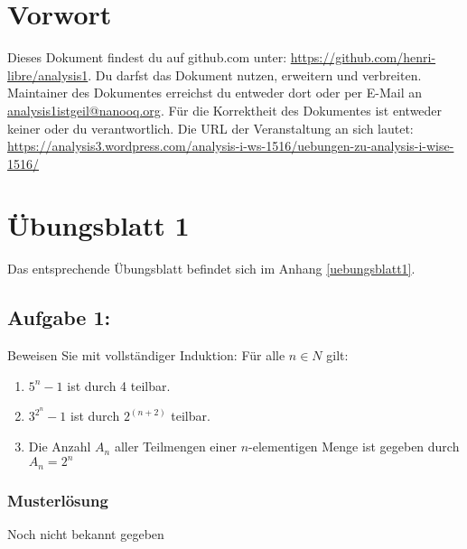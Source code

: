 \documentclass[12pt,a4paper]{report}
\begin{document}
	\tableofcontents
	\newpage
	
	\chapter{Vorwort}
	Dieses Dokument findest du auf github.com unter: \href{https://github.com/henri-libre/analysis1}{https://github.com/henri-libre/analysis1}. Du darfst das Dokument nutzen, erweitern und verbreiten. Maintainer des Dokumentes erreichst du entweder dort oder per E-Mail an \href{analysis1istgeil@nanooq.org}{analysis1istgeil@nanooq.org}. Für die Korrektheit des Dokumentes ist entweder keiner oder du verantwortlich. Die URL der Veranstaltung an sich lautet: \href{https://analysis3.wordpress.com/analysis-i-ws-1516/uebungen-zu-analysis-i-wise-1516/}{https://analysis3.wordpress.com/analysis-i-ws-1516/uebungen-zu-analysis-i-wise-1516/}
	
\chapter{Übungsblatt 1}
	
	Das entsprechende Übungsblatt befindet sich im Anhang \ref{uebungsblatt1}.
	
	\section{Aufgabe 1:}
	Beweisen Sie mit vollständiger Induktion: Für alle $ n \in N $ gilt:
	\begin{enumerate}
	\item $ 5^n - 1 $ ist durch 4 teilbar.
	\item $ 3^{2^n} - 1 $ ist durch $ 2^(n+2)$ teilbar.
	\item Die Anzahl $A_n$ aller Teilmengen einer $n$-elementigen Menge ist gegeben durch $A_n=2^n$
	\end{enumerate}
	
	\subsection{Musterlösung}
	Noch nicht bekannt gegeben
	
\end{document}

